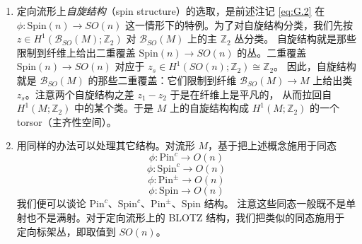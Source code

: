 \begin{enumerate}[start=5]
  \item 定向流形上\emph{自旋结构}（spin structure）的选取，是前述注记 \eqref{eq:G.2} 在
    $\phi:\mathrm{Spin}(n)\to SO(n)$ 这一情形下的特例。为了对自旋结构分类，我们先按
    $z\in H^1(\mathcal{B}_{SO}(M);\mathbb{Z}_2)$ 对 $\mathcal{B}_{SO}(M)$ 上的主 $\mathbb{Z}_2$ 丛分类。
    自旋结构就是那些限制到纤维上给出二重覆盖 $\mathrm{Spin}(n)\to SO(n)$ 的丛。二重覆盖
    $\mathrm{Spin}(n)\to SO(n)$ 对应于 $z_s\in H^1(SO(n);\mathbb{Z}_2)\cong\mathbb{Z}_2$。
    因此，自旋结构就是 $\mathcal{B}_{SO}(M)$ 的那些二重覆盖：它们限制到纤维
    $\mathcal{B}_{SO}(M)\to M$ 上给出类 $z_s$。注意两个自旋结构之差 $z_1-z_2$ 于是在纤维上是平凡的，
    从而拉回自 $H^1(M;\mathbb{Z}_2)$ 中的某个类。于是 $M$ 上的自旋结构构成
    $H^1(M;\mathbb{Z}_2)$ 的一个 torsor（主齐性空间）。

  \item 用同样的办法可以处理其它结构。对流形 $M$，基于把上述概念施用于同态
    \begin{equation}
      \phi : \mathrm{Pin}^c \to O(n)
      \tag{G.5}
      \label{eq:G.5}
    \end{equation}
    \begin{equation}
      \phi : \mathrm{Spin}^c \to O(n)
      \tag{G.6}
      \label{eq:G.6}
    \end{equation}
    \begin{equation}
      \phi : \mathrm{Pin}^{\pm} \to O(n)
      \tag{G.7}
      \label{eq:G.7}
    \end{equation}
    \begin{equation}
      \phi : \mathrm{Spin} \to O(n)
      \tag{G.8}
      \label{eq:G.8}
    \end{equation}
    \begin{equation}
      \tag{G.9}
      \label{eq:G.9}
    \end{equation}
    我们便可以谈论 $\mathrm{Pin}^c$、$\mathrm{Spin}^c$、$\mathrm{Pin}^{\pm}$、$\mathrm{Spin}$ 结构。
    注意这些同态一般既不是单射也不是满射。对于定向流形上的 BLOTZ 结构，我们把类似的同态施用于
    定向标架丛，即取值到 $SO(n)$。

\end{enumerate}

